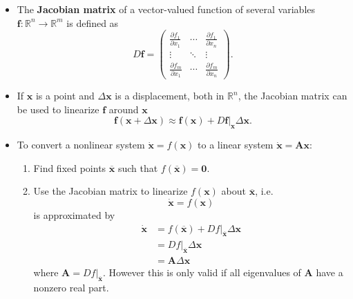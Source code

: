 \documentclass{article}
\renewcommand{\vec}[1]{\boldsymbol{\mathbf{#1}}}
\newcommand{\dvec}[1]{\dot{\vec{#1}}}
\begin{document}
\begin{itemize}
  \item The \textbf{Jacobian matrix} of a vector-valued function of several variables $\vec{f} : \mathbb{R}^n \rightarrow \mathbb{R}^m$ is defined as \[D \vec{f} = \begin{pmatrix}
            \frac{\partial f_1}{\partial x_1} & \cdots & \frac{\partial f_1}{\partial x_n} \\
            \vdots                            & \ddots & \vdots                            \\
            \frac{\partial f_m}{\partial x_1} & \cdots & \frac{\partial f_m}{\partial x_n}
          \end{pmatrix}.\]

  \item If $\vec{x}$ is a point and $\Delta \vec{x}$ is a displacement, both in $\mathbb{R}^n$, the Jacobian matrix can be used to linearize $\vec{f}$ around $\vec{x}$ \[\vec{f}(\vec{x} + \Delta \vec{x}) \approx \vec{f}(\vec{x}) + D \vec{f}|_{\vec{x}} \Delta \vec{x}.\]

  \item To convert a nonlinear system $\dvec{x} = f(\vec{x})$ to a linear system $\dvec{x} = \vec{A} \vec{x}$:

        \begin{enumerate}
          \item Find fixed points $\overline{\vec{x}}$ such that $f(\overline{\vec{x}}) = \vec{0}$.

          \item Use the Jacobian matrix to linearize $f(\vec{x})$ about $\overline{\vec{x}}$, i.e. \[\dvec{x} = f(\vec{x})\] is approximated by \begin{align*}
                  \dvec{x} & = f(\overline{\vec{x}}) + D f|_{\overline{\vec{x}}} \Delta \vec{x} \\
                           & = D f|_{\overline{\vec{x}}} \Delta \vec{x}                         \\
                           & = \vec{A} \Delta \vec{x}
                \end{align*} where $\vec{A} = D f|_{\overline{\vec{x}}}$. However this is only valid if all eigenvalues of $\vec{A}$ have a nonzero real part.
        \end{enumerate}
\end{itemize}
\end{document}
